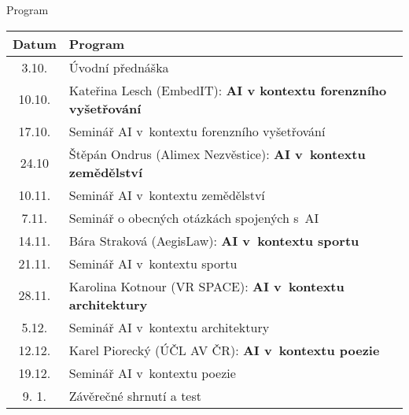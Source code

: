 \begin{frame}{Program}

    \footnotesize\centering
    \begin{tabular}{cp{300pt}}
        \toprule
    Datum   &   Program \\ \midrule
     3.10. & Úvodní přednáška \\ \midrule

    10.10. & Kateřina Lesch (EmbedIT): \hfill \textbf{AI v kontextu forenzního vyšetřování}  \\
    17.10. & Seminář AI v~kontextu forenzního vyšetřování \\ \midrule

    24.10  & Štěpán Ondrus (Alimex Nezvěstice): \hfill \textbf{AI v~kontextu zemědělství} \\
    10.11. & Seminář AI v~kontextu zemědělství \\ \midrule

	 7.11. & Seminář o obecných otázkách spojených s~AI \\ \midrule

	14.11. & Bára Straková (AegisLaw): \hfill \textbf{AI v~kontextu sportu} \\
	21.11. & Seminář AI v~kontextu sportu \\ \midrule

    28.11. & Karolina Kotnour (VR SPACE): \hfill \textbf{AI v~kontextu architektury} \\
	 5.12. & Seminář AI v~kontextu architektury \\ \midrule

    12.12. & Karel Piorecký (ÚČL AV ČR): \hfill \textbf{AI v~kontextu poezie} \\
	19.12. & Seminář AI v~kontextu poezie \\ \midrule

     9. 1.  & Závěrečné shrnutí a test \\
    \bottomrule
    \end{tabular}

\end{frame}
